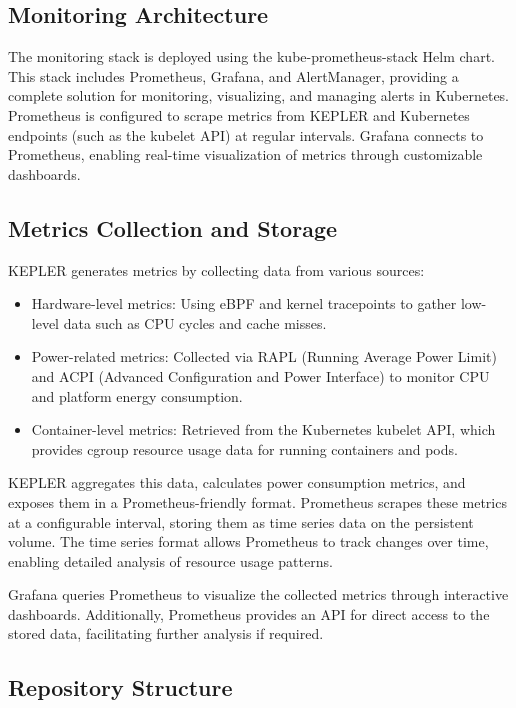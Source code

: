 \subsection{Monitoring Architecture}

The monitoring stack is deployed using the kube-prometheus-stack Helm chart. This stack includes Prometheus, Grafana, and AlertManager, providing a complete solution for monitoring, visualizing, and managing alerts in Kubernetes. Prometheus is configured to scrape metrics from KEPLER and Kubernetes endpoints (such as the kubelet API) at regular intervals. Grafana connects to Prometheus, enabling real-time visualization of metrics through customizable dashboards.

\subsection{Metrics Collection and Storage}

KEPLER generates metrics by collecting data from various sources:
\begin{itemize}
\item Hardware-level metrics: Using eBPF and kernel tracepoints to gather low-level data such as CPU cycles and cache misses.
\item Power-related metrics: Collected via RAPL (Running Average Power Limit) and ACPI (Advanced Configuration and Power Interface) to monitor CPU and platform energy consumption.
\item Container-level metrics: Retrieved from the Kubernetes kubelet API, which provides cgroup resource usage data for running containers and pods.
\end{itemize}

KEPLER aggregates this data, calculates power consumption metrics, and exposes them in a Prometheus-friendly format. Prometheus scrapes these metrics at a configurable interval, storing them as time series data on the persistent volume. The time series format allows Prometheus to track changes over time, enabling detailed analysis of resource usage patterns.

Grafana queries Prometheus to visualize the collected metrics through interactive dashboards. Additionally, Prometheus provides an API for direct access to the stored data, facilitating further analysis if required.

\subsection{Repository Structure}

